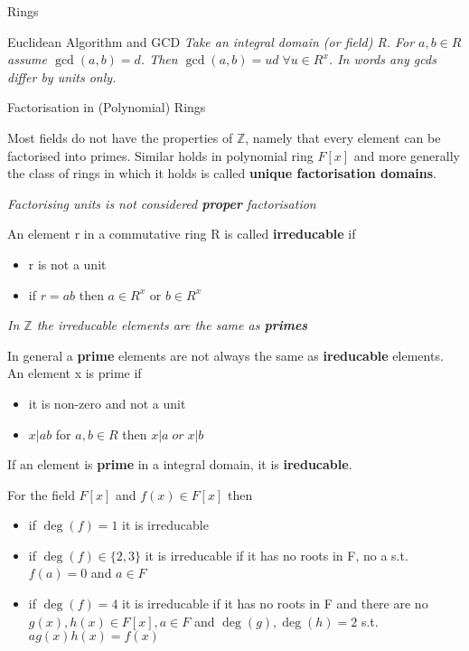 \documentclass[12pt, letterpaper]{article}
\begin{document}
\begin{section}{Rings}
\begin{subsection}{Euclidean Algorithm and GCD}
    \emph{Take an integral domain (or field) R. For \(a, b \in R\) assume \(\gcd(a, b) = d\).
      Then \(\gcd(a, b) = ud \; \forall u \in R^{x}\). In words any gcds differ
      by units only.}

  \end{subsection}

  \begin{subsection}{Factorisation in (Polynomial) Rings}

    Most fields do not have the properties of \(\mathbb{Z}\), namely that every
    element can be factorised into primes. Similar holds in polynomial ring \(F[x]\)
    and more generally the class of rings in which it holds is called
    \textbf{unique factorisation domains}.

    \emph{Factorising units is not considered \textbf{proper} factorisation}

    An element r in a commutative ring R is called \textbf{irreducable} if
    \begin{itemize}
      \item r is not a unit
      \item if \(r = ab\) then \(a \in R^{x}\) or \(b \in R^{x}\)
    \end{itemize}

    \emph{In \(\mathbb{Z}\) the irreducable elements are the same as \textbf{primes}}

    In general a \textbf{prime} elements are not always the same as
    \textbf{ireducable} elements. An element x is prime if
    \begin{itemize}
      \item it is non-zero and not a unit
      \item \(x | ab\) for \(a, b \in R\) then \(x | a \; or \; x | b\)
    \end{itemize}
    If an element is \textbf{prime} in a integral domain, it is \textbf{ireducable}.

    For the field \(F[x]\) and \(f(x) \in F[x]\) then
    \begin{itemize}
      \item if \(\deg(f) = 1\) it is irreducable
      \item if \(\deg(f) \in \{ 2, 3 \}\) it is irreducable if it has no roots
            in F, no a s.t. \(f(a) = 0\) and \(a \in F\)\
      \item if \(\deg(f) = 4\) it is irreducable if it has no roots in F
            and there are no \(g(x), h(x) \in F[x], a \in F\) and \(\deg(g), \deg(h) = 2\)
            s.t. \(ag(x)h(x) = f(x)\)
    \end{itemize}


\end{subsection}
\end{section}
\end{document}
